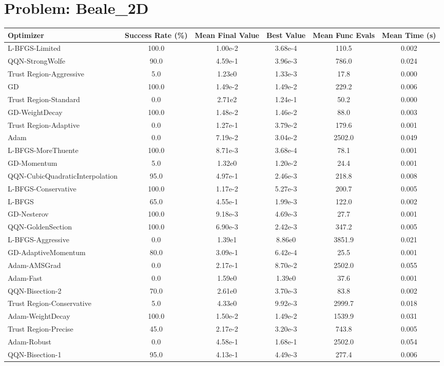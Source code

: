 \documentclass{article}
\begin{document}
\section{Problem: Beale\_2D}
\begin{longtable}{p{3cm}*{5}{c}}
\toprule
\textbf{Optimizer} & \textbf{Success Rate (\%)} & \textbf{Mean Final Value} & \textbf{Best Value} & \textbf{Mean Func Evals} & \textbf{Mean Time (s)} \\
\midrule
L-BFGS-Limited & 100.0 & 1.00e-2 & 3.68e-4 & 110.5 & 0.002 \\
QQN-StrongWolfe & 90.0 & 4.59e-1 & 3.96e-3 & 786.0 & 0.024 \\
Trust Region-Aggressive & 5.0 & 1.23e0 & 1.33e-3 & 17.8 & 0.000 \\
GD & 100.0 & 1.49e-2 & 1.49e-2 & 229.2 & 0.006 \\
Trust Region-Standard & 0.0 & 2.71e2 & 1.24e-1 & 50.2 & 0.000 \\
GD-WeightDecay & 100.0 & 1.48e-2 & 1.46e-2 & 88.0 & 0.003 \\
Trust Region-Adaptive & 0.0 & 1.27e-1 & 3.79e-2 & 179.6 & 0.001 \\
Adam & 0.0 & 7.19e-2 & 3.04e-2 & 2502.0 & 0.049 \\
L-BFGS-MoreThuente & 100.0 & 8.71e-3 & 3.68e-4 & 78.1 & 0.001 \\
GD-Momentum & 5.0 & 1.32e0 & 1.20e-2 & 24.4 & 0.001 \\
QQN-CubicQuadraticInterpolation & 95.0 & 4.97e-1 & 2.46e-3 & 218.8 & 0.008 \\
L-BFGS-Conservative & 100.0 & 1.17e-2 & 5.27e-3 & 200.7 & 0.005 \\
L-BFGS & 65.0 & 4.55e-1 & 1.99e-3 & 122.0 & 0.002 \\
GD-Nesterov & 100.0 & 9.18e-3 & 4.69e-3 & 27.7 & 0.001 \\
QQN-GoldenSection & 100.0 & 6.90e-3 & 2.42e-3 & 347.2 & 0.005 \\
L-BFGS-Aggressive & 0.0 & 1.39e1 & 8.86e0 & 3851.9 & 0.021 \\
GD-AdaptiveMomentum & 80.0 & 3.09e-1 & 6.42e-4 & 25.5 & 0.001 \\
Adam-AMSGrad & 0.0 & 2.17e-1 & 8.70e-2 & 2502.0 & 0.055 \\
Adam-Fast & 0.0 & 1.59e0 & 1.39e0 & 37.6 & 0.001 \\
QQN-Bisection-2 & 70.0 & 2.61e0 & 3.70e-3 & 83.8 & 0.002 \\
Trust Region-Conservative & 5.0 & 4.33e0 & 9.92e-3 & 2999.7 & 0.018 \\
Adam-WeightDecay & 100.0 & 1.50e-2 & 1.49e-2 & 1539.9 & 0.031 \\
Trust Region-Precise & 45.0 & 2.17e-2 & 3.20e-3 & 743.8 & 0.005 \\
Adam-Robust & 0.0 & 4.58e-1 & 1.68e-1 & 2502.0 & 0.054 \\
QQN-Bisection-1 & 95.0 & 4.13e-1 & 4.49e-3 & 277.4 & 0.006 \\
\bottomrule
\end{longtable}
\end{document}
